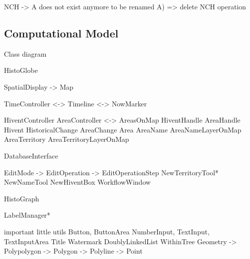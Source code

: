   NCH -> A does not exist anymore to be renamed
A)    => delete NCH operation




\subsection{Computational Model} %
\label{sub:computational_model}

Class diagram

HistoGlobe

SpatialDisplay -> Map

TimeController  <-> Timeline
                <-> NowMarker

HiventController                AreaController <->  AreasOnMap
HiventHandle                    AreaHandle
Hivent
HistoricalChange    AreaChange  Area
                                AreaName            AreaNameLayerOnMap
                                AreaTerritory       AreaTerritoryLayerOnMap

DatabaseInterface

EditMode -> EditOperation -> EditOperationStep
NewTerritoryTool* NewNameTool NewHiventBox
WorkflowWindow

HistoGraph

LabelManager*

important little utils
  Button, ButtonArea
  NumberInput, TextInput, TextInputArea
  Title
  Watermark
  DoublyLinkedList
  WithinTree
  Geometry -> Polypolygon -> Polygon -> Polyline -> Point




